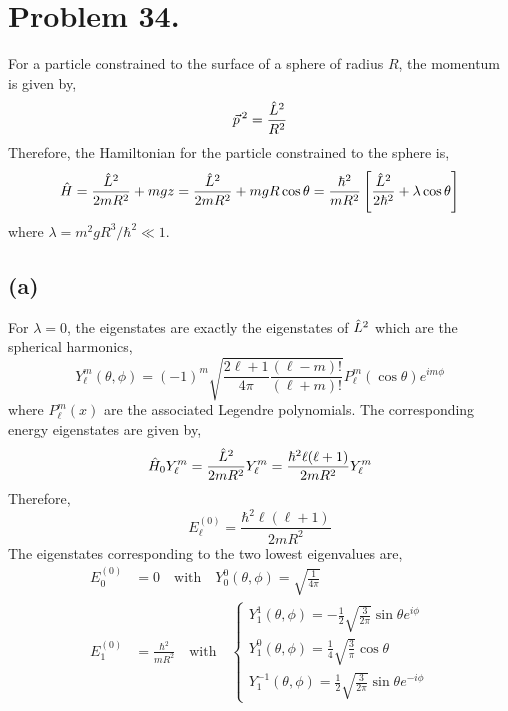 \documentclass[12pt]{extarticle}
\begin{document}
\section*{Problem 34.}

For a particle constrained to the surface of a sphere of radius $R$, the momentum is given by, \[\vec{p}^{\,2} = \frac{\hat{L}^2}{R^2}\]
Therefore, the Hamiltonian for the particle constrained to the sphere is,
\[\hat{H} = \frac{\hat{L}^2}{2mR^2} + mgz = \frac{\hat{L}^2}{2mR^2} + mg R \cos{\theta} = \frac{\hbar^2}{mR^2} \left[ \frac{\hat{L}^2}{2 \hbar^2} + \lambda \cos{\theta} \right] \] 
where $\lambda = m^2 g R^3/\hbar^2 \ll 1$. 

\subsection*{(a)}
For $\lambda = 0$, the eigenstates are exactly the eigenstates of $\hat{L}^2$ which are the spherical harmonics,
\[ Y_\ell^m(\theta, \phi) = (-1)^m \sqrt{\frac{2\ell + 1}{4\pi} \frac{(\ell - m)!}{(\ell + m)!}} P^m_\ell(\cos{\theta}) e^{i m \phi} \]
where $P^m_\ell(x)$ are the associated Legendre polynomials. The corresponding energy eigenstates are given by,
\[\hat{H}_0 Y_\ell^m = \frac{\hat{L}^2}{2mR^2} Y_\ell^m = \frac{\hbar^2 \ell(\ell + 1)}{2 m R^2} Y_\ell^m \]
Therefore, 
\[E^{(0)}_\ell = \frac{\hbar^2 \ell(\ell + 1)}{2 m R^2}\]
The eigenstates corresponding to the two lowest eigenvalues are,
\begin{align*}
E^{(0)}_0 &= 0 \quad \text{with} \quad Y^0_0(\theta, \phi) = \sqrt{\frac{1}{4 \pi}} \\
E^{(0)}_1 &= \frac{\hbar^2}{m R^2} \quad \text{with} \quad
\begin{cases}
Y^1_1(\theta, \phi) = -\frac{1}{2}  \sqrt{\frac{3}{2 \pi}} \sin{\theta} e^{i \phi} \\
Y^0_1(\theta, \phi) = \frac{1}{4} \sqrt{\frac{3}{\pi}} \cos{\theta} \\
Y^{-1}_1(\theta, \phi) = \frac{1}{2}  \sqrt{\frac{3}{2 \pi}} \sin{\theta} e^{-i \phi}
\end{cases}
\end{align*}
\end{document}
